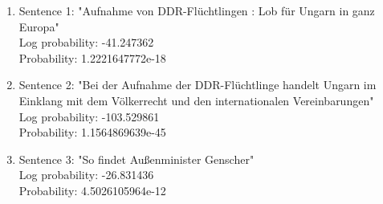 \documentclass[a4paper,margin=1cm]{article}
\begin{document}
\begin{enumerate}
\item Sentence 1: "Aufnahme von DDR-Flüchtlingen : Lob für Ungarn in ganz Europa"\\
   Log probability: -41.247362\\
   Probability: 1.2221647772e-18

\item Sentence 2: "Bei der Aufnahme der DDR-Flüchtlinge handelt Ungarn im Einklang mit dem Völkerrecht und den internationalen Vereinbarungen"\\
   Log probability: -103.529861\\
   Probability: 1.1564869639e-45

\item Sentence 3: "So findet Außenminister Genscher"\\
   Log probability: -26.831436\\
   Probability: 4.5026105964e-12
\end{enumerate}
\end{document}

